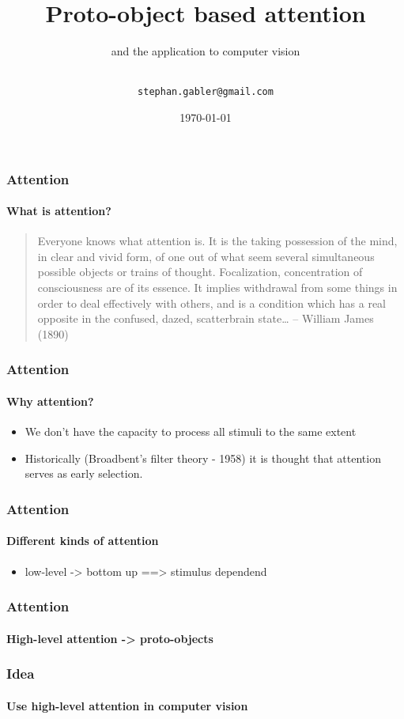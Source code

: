 \documentclass{beamer}
\title[Proto-Objects]{Proto-object based attention}
\subtitle{and the application to computer vision}
\author[Stephan Gabler] { \\\texttt{stephan.gabler@gmail.com}}
\date[06/2011] {\today}
\begin{document}
\frame{\titlepage}

\begin{frame}
    \frametitle{Attention}
    \framesubtitle{What is attention?}
    \begin{quotation}
        Everyone knows what attention is. It is the taking possession of the mind, in clear and vivid form, of one out of what seem several simultaneous possible objects or trains of thought. Focalization, concentration of consciousness are of its essence. It implies withdrawal from some things in order to deal effectively with others, and is a condition which has a real opposite in the confused, dazed, scatterbrain state… – William James (1890)
    \end{quotation}
\end{frame}


\begin{frame}
    \frametitle{Attention}
    \framesubtitle{Why attention?}
    
    \begin{itemize}
        \item<1-> We don't have the capacity to process all stimuli to the same extent
        \item<2-> Historically (Broadbent's filter theory - 1958) it is thought that attention serves as early selection.
    \end{itemize}
\end{frame}


\begin{frame}
    \frametitle{Attention}
    \framesubtitle{Different kinds of attention}
    \begin{itemize}
        \item low-level -> bottom up ==> stimulus dependend
    \end{itemize}
    
\end{frame}


\begin{frame}
    \frametitle{Attention}
    \framesubtitle{High-level attention -> proto-objects}
    
\end{frame}


\begin{frame}
    \frametitle{Idea}
    \framesubtitle{Use high-level attention in computer vision}
    
\end{frame}
\end{document}
